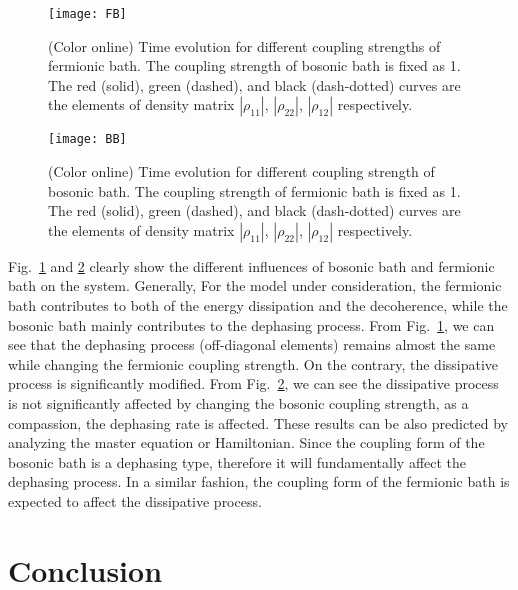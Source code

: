 \documentclass[preprint]{elsarticle}
\begin{document}
\noindent 
\begin{figure}
\begin{centering}
\texttt{[image: FB]}
\par\end{centering}

\caption{(Color online) Time evolution for different coupling strengths of fermionic
bath. The coupling strength of bosonic bath is fixed as 1. The red
(solid), green (dashed), and black (dash-dotted) curves are the elements
of density matrix $|\rho_{11}|$, $|\rho_{22}|$, $|\rho_{12}|$ respectively.}

\label{FB}
\end{figure}


\begin{figure}
\begin{centering}
\texttt{[image: BB]}
\par\end{centering}

\caption{(Color online) Time evolution for different coupling strength of bosonic
bath. The coupling strength of fermionic bath is fixed as 1. The red
(solid), green (dashed), and black (dash-dotted) curves are the elements
of density matrix $|\rho_{11}|$, $|\rho_{22}|$, $|\rho_{12}|$ respectively.}


\label{BB}
\end{figure}


Fig.~\ref{FB} and \ref{BB} clearly show the different influences of
bosonic bath and fermionic bath on the system. Generally, For the model
under consideration, the fermionic bath
contributes to both of the energy dissipation and the decoherence, while the bosonic bath mainly
contributes to the dephasing process. From Fig.~\ref{FB}, we can
see that the dephasing process (off-diagonal elements)  remains almost the same
while changing the fermionic coupling strength. On the contrary, the
dissipative process is significantly modified. From Fig.~\ref{BB}, we
can see the dissipative process is not significantly affected by changing the bosonic
coupling strength, as a compassion, the dephasing rate is affected.
These results can be also predicted by analyzing the master equation
or Hamiltonian. Since the coupling form of the bosonic bath is a dephasing
type,  therefore it will fundamentally affect the dephasing process. In a similar fashion,
the coupling form of the fermionic bath is expected to affect the dissipative process.


\section{Conclusion}
\end{document}

